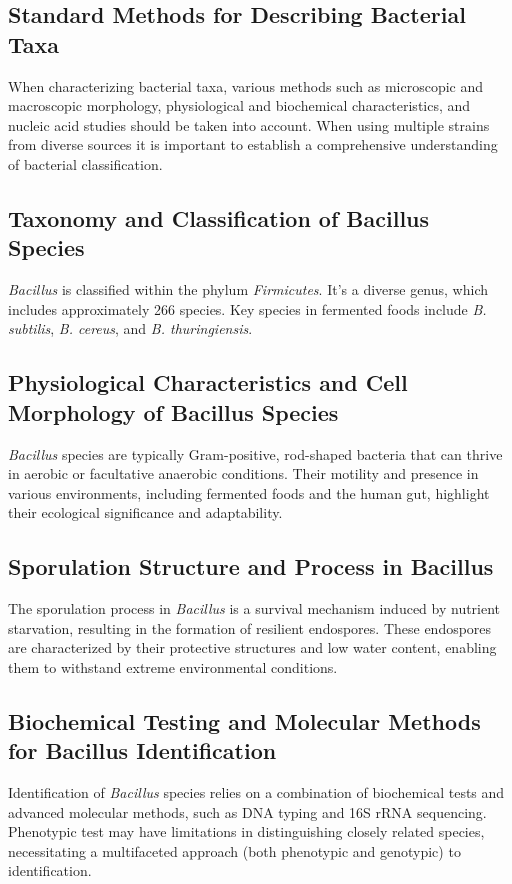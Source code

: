 \subsection{Standard Methods for Describing Bacterial Taxa}
When characterizing bacterial taxa, various methods such as microscopic and macroscopic morphology, physiological and biochemical characteristics, and nucleic acid studies should be taken into account. When using multiple strains from diverse sources it is important to establish a comprehensive understanding of bacterial classification.

\subsection{Taxonomy and Classification of Bacillus Species}
\textit{Bacillus} is classified within the phylum \textit{Firmicutes}. It's a  diverse genus, which includes approximately 266 species. Key species in fermented foods include \textit{B. subtilis}, \textit{B. cereus}, and \textit{B. thuringiensis}. 

\subsection{Physiological Characteristics and Cell Morphology of Bacillus Species}
\textit{Bacillus} species are typically Gram-positive, rod-shaped bacteria that can thrive in aerobic or facultative anaerobic conditions. Their motility and presence in various environments, including fermented foods and the human gut, highlight their ecological significance and adaptability.

\subsection{Sporulation Structure and Process in Bacillus}
The sporulation process in \textit{Bacillus} is a survival mechanism induced by nutrient starvation, resulting in the formation of resilient endospores. These endospores are characterized by their protective structures and low water content, enabling them to withstand extreme environmental conditions.

\subsection{Biochemical Testing and Molecular Methods for Bacillus Identification}
Identification of \textit{Bacillus} species relies on a combination of biochemical tests and advanced molecular methods, such as DNA typing and 16S rRNA sequencing. Phenotypic test may have limitations in distinguishing closely related species, necessitating a multifaceted approach (both phenotypic and genotypic) to identification.

